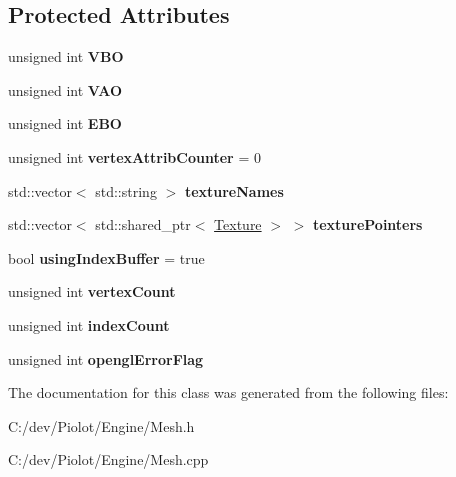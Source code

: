 \subsection*{Protected Attributes}
\begin{DoxyCompactItemize}
\item 
\mbox{\label{classpiolot_1_1_mesh_a937bc2daa3a4b8e7d751ce7dbd65cb43}} 
unsigned int {\bfseries V\+BO}
\item 
\mbox{\label{classpiolot_1_1_mesh_a6ad4c6fbd31933aa4803650f918ab277}} 
unsigned int {\bfseries V\+AO}
\item 
\mbox{\label{classpiolot_1_1_mesh_a523f048f2a1ec6bdbe3179d1b1822647}} 
unsigned int {\bfseries E\+BO}
\item 
\mbox{\label{classpiolot_1_1_mesh_a641fac9e111d3eed8992e7a616d6f9bc}} 
unsigned int {\bfseries vertex\+Attrib\+Counter} = 0
\item 
\mbox{\label{classpiolot_1_1_mesh_a846f32a4e5b9426db5fdc76a6828b195}} 
std\+::vector$<$ std\+::string $>$ {\bfseries texture\+Names}
\item 
\mbox{\label{classpiolot_1_1_mesh_a266423d1215e337db045baa99ca6ad88}} 
std\+::vector$<$ std\+::shared\+\_\+ptr$<$ \mbox{\hyperlink{classpiolot_1_1_texture}{Texture}} $>$ $>$ {\bfseries texture\+Pointers}
\item 
\mbox{\label{classpiolot_1_1_mesh_a490f057b9ff145fd162d31839bfda5e0}} 
bool {\bfseries using\+Index\+Buffer} = true
\item 
\mbox{\label{classpiolot_1_1_mesh_a7db2c12891c5df244ab243ce75f68c02}} 
unsigned int {\bfseries vertex\+Count}
\item 
\mbox{\label{classpiolot_1_1_mesh_a4483ae9ec80da17e7bc4277d032112ab}} 
unsigned int {\bfseries index\+Count}
\item 
\mbox{\label{classpiolot_1_1_mesh_a8d286f1e153dfcbd2883b347c9a4f162}} 
unsigned int {\bfseries opengl\+Error\+Flag}
\end{DoxyCompactItemize}


The documentation for this class was generated from the following files\+:\begin{DoxyCompactItemize}
\item 
C\+:/dev/\+Piolot/\+Engine/Mesh.\+h\item 
C\+:/dev/\+Piolot/\+Engine/Mesh.\+cpp\end{DoxyCompactItemize}
